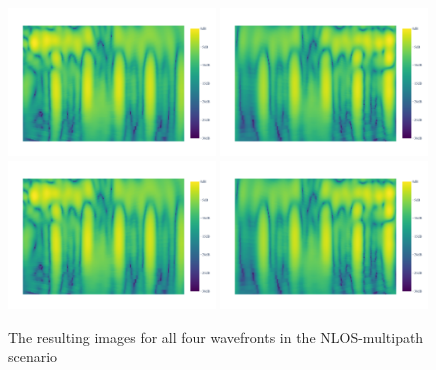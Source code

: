 \begin{figure}[hp]
    \vspace{-1em} %
    \includegraphics[page=2, trim=0mm 10mm 0mm 20mm, clip, width=0.49\textwidth]{figures/multipath_nlos_wavefront3.pdf}
    \includegraphics[page=2, trim=0mm 10mm 0mm 20mm, clip, width=0.49\textwidth]{figures/multipath_nlos_wavefront4.pdf}
    \vspace{-1em} %
    \includegraphics[page=1, width=0.49\textwidth]{figures/multipath_nlos_wavefront3.pdf}
    \includegraphics[page=1, width=0.49\textwidth]{figures/multipath_nlos_wavefront4.pdf}
    \caption{The resulting images for all four wavefronts in the NLOS-multipath scenario}\label{fig:MultipathNLOS_results}
\end{figure}

